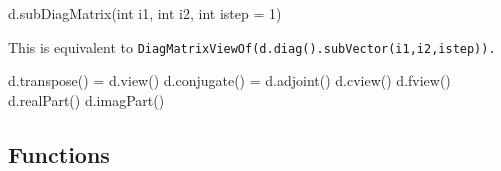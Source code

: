 \begin{tmvcode}
d.subDiagMatrix(int i1, int i2, int istep = 1)
\end{tmvcode}
This is equivalent to \tt{DiagMatrixViewOf(d.diag().subVector(i1,i2,istep))}.
\begin{tmvcode}
d.transpose() = d.view()
d.conjugate() = d.adjoint()
d.cview()
d.fview()
d.realPart()
d.imagPart()
\end{tmvcode}

\subsection{Functions}
\label{DiagMatrix_Functions}

